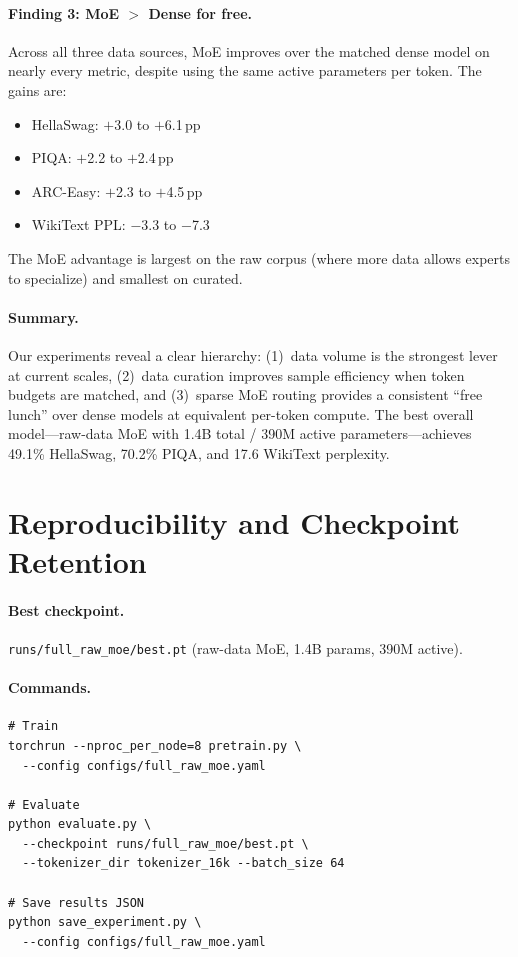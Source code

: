 \documentclass[10pt]{article}
\begin{document}
\paragraph{Finding 3: MoE $>$ Dense for free.}
Across all three data sources, MoE improves over the matched dense model on nearly every metric, despite using the same active parameters per token. The gains are:
\begin{itemize}
    \item HellaSwag: $+$3.0 to $+$6.1\,pp
    \item PIQA: $+$2.2 to $+$2.4\,pp
    \item ARC-Easy: $+$2.3 to $+$4.5\,pp
    \item WikiText PPL: $-$3.3 to $-$7.3
\end{itemize}
The MoE advantage is largest on the raw corpus (where more data allows experts to specialize) and smallest on curated.

\paragraph{Summary.}
Our experiments reveal a clear hierarchy: (1)~data volume is the strongest lever at current scales, (2)~data curation improves sample efficiency when token budgets are matched, and (3)~sparse MoE routing provides a consistent ``free lunch'' over dense models at equivalent per-token compute. The best overall model---raw-data MoE with 1.4B total / 390M active parameters---achieves 49.1\% HellaSwag, 70.2\% PIQA, and 17.6 WikiText perplexity.

\section{Reproducibility and Checkpoint Retention}
\label{sec:reproducibility}

\paragraph{Best checkpoint.}
\texttt{runs/full\_raw\_moe/best.pt} (raw-data MoE, 1.4B params, 390M active).

\paragraph{Commands.}
\begin{verbatim}
# Train
torchrun --nproc_per_node=8 pretrain.py \
  --config configs/full_raw_moe.yaml

# Evaluate
python evaluate.py \
  --checkpoint runs/full_raw_moe/best.pt \
  --tokenizer_dir tokenizer_16k --batch_size 64

# Save results JSON
python save_experiment.py \
  --config configs/full_raw_moe.yaml
\end{verbatim}
\end{document}

